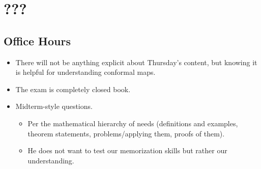 \documentclass[../notes.tex]{subfiles}
\begin{document}
\chapter{???}
\section{Office Hours}
\begin{itemize}
    \item {}There will not be anything explicit about Thursday's content, but knowing it is helpful for understanding conformal maps.
    \item The exam is completely closed book.
    \item Midterm-style questions.
    \begin{itemize}
        \item Per the mathematical hierarchy of needs (definitions and examples, theorem statements, problems/applying them, proofs of them).
        \item He does not want to test our memorization skills but rather our understanding.
    \end{itemize}
\end{itemize}
\end{document}
